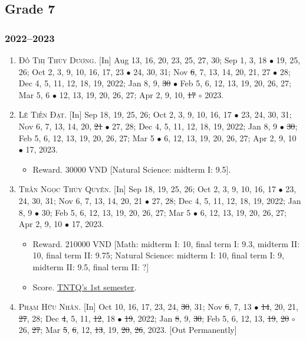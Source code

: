 \documentclass{article}
\begin{document}
\subsection{Grade 7}

\subsubsection{2022--2023}

\begin{enumerate}
	\item \textsc{Đỗ Thị Thùy Dương.} \textsf{[In]} Aug 13, 16, 20, 23, 25, 27, 30; Sep 1, 3, 18 $\bullet$ 19, 25, 26; Oct 2, 3, 9, 10, 16, 17, 23 $\bullet$ 24, 30, 31; Nov \st{6}, 7, 13, 14, 20, 21, 27 $\bullet$ 28; Dec 4, 5, 11, 12, 18, 19, 2022; Jan 8, 9, \st{30} $\bullet$ Feb 5, 6, 12, 13, 19, 20, 26, 27; Mar 5, 6 $\bullet$ 12, 13, 19, 20, 26, 27; Apr 2, 9, 10, \st{17} $\circ$ 2023.
	\item \textsc{Lê Tiến Đạt.} \textsf{[In]} Sep 18, 19, 25, 26; Oct 2, 3, 9, 10, 16, 17 $\bullet$ 23, 24, 30, 31; Nov 6, 7, 13, 14, 20, \st{21} $\bullet$ 27, 28; Dec 4, 5, 11, 12, 18, 19, 2022; Jan 8, 9 $\bullet$ \st{30}; Feb 5, 6, 12, 13, 19, 20, 26, 27; Mar 5 $\bullet$ 6, 12, 13, 19, 20, 26, 27; Apr 2, 9, 10 $\bullet$ 17, 2023.
	\begin{itemize}
		\item \textsf{Reward.} 30000 VND [Natural Science: midterm I: 9.5].
	\end{itemize}
	\item \textsc{Trần Ngọc Thúy Quyên.} \textsf{[In]} Sep 18, 19, 25, 26; Oct 2, 3, 9, 10, 16, 17 $\bullet$ 23, 24, 30, 31; Nov 6, 7, 13, 14, 20, 21 $\bullet$ 27, 28; Dec 4, 5, 11, 12, 18, 19, 2022; Jan 8, 9 $\bullet$ 30; Feb 5, 6, 12, 13, 19, 20, 26, 27; Mar 5 $\bullet$ 6, 12, 13, 19, 20, 26, 27; Apr 2, 9, 10 $\bullet$ 17, 2023.
	\begin{itemize}
		\item \textsf{Reward.} 210000 VND [Math: midterm I: 10, final term I: 9.3, midterm II: 10, final term II: 9.75; Natural Science: midterm I: 10, final term I: 9, midterm II: 9.5, final term II: ?]
		\item \textsf{Score.} \href{https://github.com/NQBH/hobby/blob/master/STEM/student/Tran_Ngoc_Thuy_Quyen_grade_7_1st_semester.jpg}{TNTQ's 1st semester}.
	\end{itemize}
	\item \textsc{Phạm Hữu Nhân.} \textsf{[In]} Oct 10, 16, 17, 23, 24, \st{30}, 31; Nov \st{6}, 7, 13 $\bullet$ \st{14}, 20, 21, \st{27}, 28; Dec \st{4}, 5, 11, \st{12}, 18 $\bullet$ \st{19}, 2022; Jan \st{8}, 9, \st{30}; Feb 5, 6, 12, 13, \st{19}, \st{20} $\circ$ 26, \st{27}; Mar \st{5}, \st{6}, 12, \st{13}, 19, \st{20}, \st{26}, 2023. \textsf{[Out Permanently]}

\end{enumerate}
\end{document}
